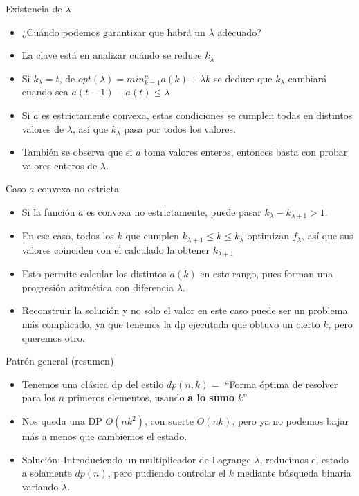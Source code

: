 \documentclass{beamer}
\begin{document}
\begin{frame}{Existencia de $\lambda$}
    \begin{itemize}
		\item ¿Cuándo podemos garantizar que habrá un $\lambda$ adecuado?
        \item La clave está en analizar cuándo se reduce $k_\lambda$
        \item Si $k_\lambda = t$, de $opt(\lambda) = min_{k=1}^{n}{a(k) + \lambda k}$  se deduce que $k_\lambda$ cambiará cuando sea $a(t-1) - a(t) \leq \lambda$
        \item Si $a$ es estrictamente convexa, estas condiciones se cumplen todas en distintos valores de $\lambda$, así que $k_\lambda$ pasa por todos los valores.
        \item También se observa que si $a$ toma valores enteros, entonces basta con probar valores enteros de $\lambda$.
        
    \end{itemize}
\end{frame}

\begin{frame}{Caso $a$ convexa no estricta}
    \begin{itemize}
        \item Si la función $a$ es convexa no estrictamente, puede pasar $k_\lambda - k_{\lambda+1} > 1$.
        \item En ese caso, todos los $k$ que cumplen $k_{\lambda+1} \leq k \leq k_\lambda$
            optimizan $f_\lambda$, así que sus valores coinciden con el calculado la obtener $k_{\lambda+1}$
        \item Esto permite calcular los distintos $a(k)$ en este rango, pues forman una progresión aritmética con diferencia $\lambda$.
        \item Reconstruir la solución y no solo el valor en este caso puede ser un problema más complicado, ya que tenemos la dp ejecutada que obtuvo un cierto $k$, pero queremos otro.
    \end{itemize}
\end{frame}

\begin{frame}{Patrón general (resumen)}
    \begin{itemize}
		\item Tenemos una clásica dp del estilo $dp(n,k) = $ ``Forma óptima de resolver para los $n$ primeros elementos, usando \textbf{a lo sumo} $k$''
        \item Nos queda una DP $O(nk^2)$, con suerte $O(nk)$, pero ya no podemos bajar más a menos que cambiemos el estado.
        \item Solución: Introduciendo un multiplicador de Lagrange $\lambda$, reducimos el estado a solamente $dp(n)$, pero pudiendo controlar el $k$ mediante búsqueda binaria variando $\lambda$.
    \end{itemize}
\end{frame}
\end{document}
